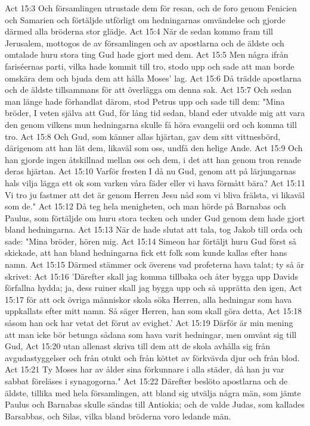 Act 15:3  Och församlingen utrustade dem för resan, och de foro genom Fenicien och Samarien och förtäljde utförligt om hedningarnas omvändelse och gjorde därmed alla bröderna stor glädje.
Act 15:4  När de sedan kommo fram till Jerusalem, mottogos de av församlingen och av apostlarna och de äldste och omtalade huru stora ting Gud hade gjort med dem.
Act 15:5  Men några ifrån fariséernas parti, vilka hade kommit till tro, stodo upp och sade att man borde omskära dem och bjuda dem att hålla Moses' lag.
Act 15:6  Då trädde apostlarna och de äldste tillsammans för att överlägga om denna sak.
Act 15:7  Och sedan man länge hade förhandlat därom, stod Petrus upp och sade till dem: "Mina bröder, I veten själva att Gud, för lång tid sedan, bland eder utvalde mig att vara den genom vilkens mun hedningarna skulle få höra evangelii ord och komma till tro.
Act 15:8  Och Gud, som känner allas hjärtan, gav dem sitt vittnesbörd, därigenom att han lät dem, likaväl som oss, undfå den helige Ande.
Act 15:9  Och han gjorde ingen åtskillnad mellan oss och dem, i det att han genom tron renade deras hjärtan.
Act 15:10  Varför fresten I då nu Gud, genom att på lärjungarnas hals vilja lägga ett ok som varken våra fäder eller vi hava förmått bära?
Act 15:11  Vi tro ju fastmer att det är genom Herren Jesu nåd som vi bliva frälsta, vi likaväl som de."
Act 15:12  Då teg hela menigheten, och man hörde på Barnabas och Paulus, som förtäljde om huru stora tecken och under Gud genom dem hade gjort bland hedningarna.
Act 15:13  När de hade slutat att tala, tog Jakob till orda och sade: "Mina bröder, hören mig.
Act 15:14  Simeon har förtäljt huru Gud först så skickade, att han bland hedningarna fick ett folk som kunde kallas efter hans namn.
Act 15:15  Därmed stämmer ock överens vad profeterna hava talat; ty så är skrivet:
Act 15:16  'Därefter skall jag komma tillbaka och åter bygga upp Davids förfallna hydda; ja, dess ruiner skall jag bygga upp och så upprätta den igen,
Act 15:17  för att ock övriga människor skola söka Herren, alla hedningar som hava uppkallats efter mitt namn. Så säger Herren, han som skall göra detta,
Act 15:18  såsom han ock har vetat det förut av evighet.'
Act 15:19  Därför är min mening att man icke bör betunga sådana som hava varit hedningar, men omvänt sig till Gud,
Act 15:20  utan allenast skriva till dem att de skola avhålla sig från avgudastyggelser och från otukt och från köttet av förkvävda djur och från blod.
Act 15:21  Ty Moses har av ålder sina förkunnare i alla städer, då han ju var sabbat föreläses i synagogorna."
Act 15:22  Därefter beslöto apostlarna och de äldste, tillika med hela församlingen, att bland sig utvälja några män, som jämte Paulus och Barnabas skulle sändas till Antiokia; och de valde Judas, som kallades Barsabbas, och Silas, vilka bland bröderna voro ledande män.
